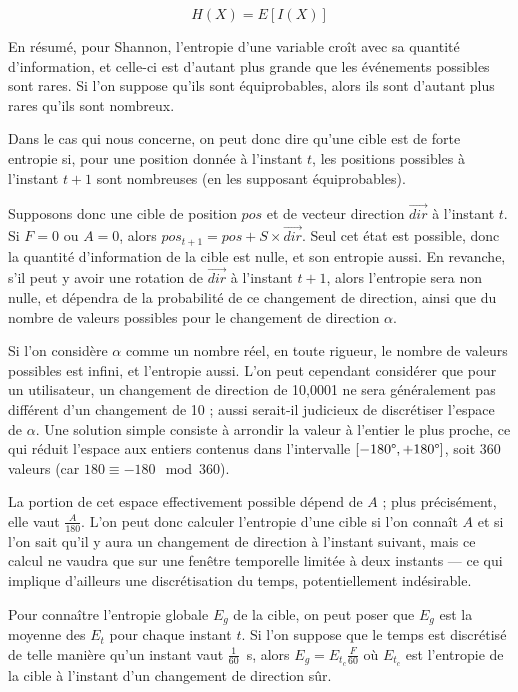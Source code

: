 	\begin{equation}
		\label{eq:shaEnt}
		H(X) = E[I(X)]
	\end{equation}
	
	En résumé, pour Shannon, l'entropie d'une variable croît avec sa quantité d'information, et celle-ci est d'autant plus grande que les événements possibles sont rares. Si l'on suppose qu'ils sont équiprobables, alors ils sont d'autant plus rares qu'ils sont nombreux.
	
	Dans le cas qui nous concerne, on peut donc dire qu'une cible est de forte entropie si, pour une position donnée à l'instant $t$, les positions possibles à l'instant $t+1$ sont nombreuses (en les supposant équiprobables).
	
	Supposons donc une cible de position $pos$ et de vecteur direction $\vec{dir}$ à l'instant $t$. Si $F=0$ ou $A=0$, alors $pos_{t+1} = pos + S \times \vec{dir}$. Seul cet état est possible, donc la quantité d'information de la cible est nulle, et son entropie aussi. En revanche, s'il peut y avoir une rotation de $\vec{dir}$ à l'instant $t+1$, alors l'entropie sera non nulle, et dépendra de la probabilité de ce changement de direction, ainsi que du nombre de valeurs possibles pour le changement de direction $\alpha$.
	
	Si l'on considère $\alpha$ comme un nombre réel, en toute rigueur, le nombre de valeurs possibles est infini, et l'entropie aussi. L'on peut cependant considérer que pour un utilisateur, un changement de direction de 10,0001\textdegree{} ne sera généralement pas différent d'un changement de 10\textdegree{} ; aussi serait-il judicieux de discrétiser l'espace de $\alpha$. Une solution simple consiste à arrondir la valeur à l'entier le plus proche, ce qui réduit l'espace aux entiers contenus dans l'intervalle $[-180\degree{}, +180\degree{}]$, soit 360 valeurs (car $180 \equiv -180 \mod 360$).
	
	La portion de cet espace effectivement possible dépend de $A$ ; plus précisément, elle vaut $\frac{A}{180}$. L'on peut donc calculer l'entropie d'une cible si l'on connaît $A$ et si l'on sait qu'il y aura un changement de direction à l'instant suivant, mais ce calcul ne vaudra que sur une fenêtre temporelle limitée à deux \og instants \fg{} --- ce qui implique d'ailleurs une discrétisation du temps, potentiellement indésirable.
	
	Pour connaître l'entropie globale $E_{g}$ de la cible, on peut poser que $E_{g}$ est la moyenne des $E_{t}$ pour chaque instant $t$. Si l'on suppose que le temps est discrétisé de telle manière qu'un instant vaut $\frac{1}{60}$~s, alors $E_{g} = E_{t_{c}} \frac{F}{60}$ où $E_{t_{c}}$ est l'entropie de la cible à l'instant d'un changement de direction sûr.
	
